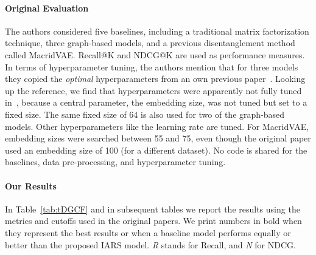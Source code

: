 \documentclass[sigconf,natbib=true,nonacm]{acmart}
\begin{document}
\paragraph{Original Evaluation}
The authors considered five baselines, including a traditional matrix factorization technique, three graph-based models, and a previous disentanglement  method called MacridVAE. Recall@K and NDCG@K are used as performance measures.  In terms of hyperparameter tuning, the authors mention that for three models they copied the \emph{optimal} hyperparameters from an own previous paper~\cite{Wang2019NGCF}. Looking up the reference, we find that hyperparameters were apparently not fully tuned in~\cite{Wang2019NGCF}, because a central parameter, the embedding size, was not tuned but set to a fixed size. The same fixed size of 64 is also used for two of the graph-based models. Other hyperparameters like the learning rate are tuned. For MacridVAE, embedding sizes were searched between 55 and 75, even though the original paper used an embedding size of 100 (for a different dataset). No code is shared for the baselines, data pre-processing, and hyperparameter tuning.

\paragraph{Our Results}
In Table~\ref{tab:tDGCF} and in subsequent tables we report the results using the metrics and cutoffs used in the original papers. We print numbers in bold when they represent the best results or when a baseline model performs equally or better than the proposed IARS model. \emph{R} stands for Recall, and \emph{N} for NDCG.
\end{document}

